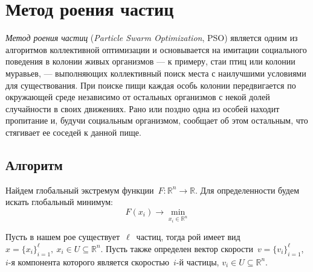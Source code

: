 
\newpage
\section{Метод роения частиц}

\noindent
\emph{Метод роения частиц} (\emph{Particle Swarm Optimization}, PSO) является одним из алгоритмов коллективной оптимизации и основывается на имитации социального поведения в колонии живых организмов --- к примеру, стаи птиц или колонии муравьев, --- выполняющих коллективный поиск места с наилучшими условиями для существования. При поиске пищи каждая особь колонии передвигается по окружающей среде независимо от остальных организмов с некой долей случайности в своих движениях. Рано или поздно одна из особей находит пропитание и, будучи социальным организмом, сообщает об этом остальным, что стягивает ее соседей к данной пище.

\subsection{Алгоритм}
\noindent
Найдем глобальный экстремум функции~$F \colon \mathbb{R}^{n} \to \mathbb{R}$. Для определенности будем искать глобальный минимум:
\[
	F(x_i) \to \min \limits _{x_i \in \mathbb{R}^{n}}
\]

Пусть в нашем рое существует~$\ell$~частиц, тогда рой имеет вид~$x = \{x_i\}_{i = 1}^{\ell}, \ x_i \in U \subseteq \mathbb{R}^n$. Пусть также определен вектор скорости~$v = \{v_i\}_{i=1}^{\ell}$,~$i$-я компонента которого является скоростью~$i$-й частицы, $v_i \in U \subseteq \mathbb{R}^n$.

